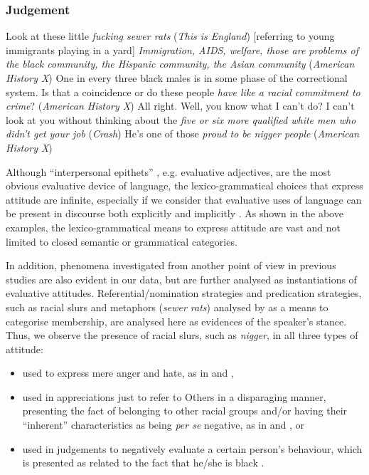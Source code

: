 \documentclass[output=paper]{LSP/langsci}
\begin{document}
\subsubsection{Judgement}


\ea \label{ex:2:12} Look at these little \emph{fucking sewer rats} (\textit{This is England}) [referring to young immigrants playing in a yard]
\z
\ea \label{ex:2:13} \emph{Immigration, AIDS, welfare, those are problems of the black community, the Hispanic community, the Asian community} (\textit{American History X})
\z
\ea \label{ex:2:14} One in every three black males is in some phase of the correctional system. Is that a coincidence or do these people \emph{have like a racial commitment to crime}? (\textit{American History X})
\z
\ea \label{ex:2:15} All right. Well, you know what I can't do? I can't look at you without thinking about the \emph{five or six more qualified white men who didn't get your job} (\textit{Crash})
\z
\ea \label{ex:2:16} He's one of those \emph{proud to be nigger people} (\textit{American History X})
\z

Although “interpersonal epithets” \citep[see][376--377]{Halliday2014}, e.g. evaluative adjectives, are the most obvious evaluative device of language, the lexico-grammatical choices that express attitude are infinite, especially if we consider that evaluative uses of language can be present in discourse both explicitly and implicitly \citep[see][23] {Munday2012}. As shown in the above examples, the lexico-grammatical means to express attitude are vast and not limited to closed semantic or grammatical categories.

In addition, phenomena investigated from another point of view in previous studies are also evident in our data, but are further analysed as instantiations of evaluative attitudes. Referential/nomination strategies and predication strategies, such as racial slurs and metaphors (\textit{sewer rats}) analysed by \citet{Reisigl2001} as a means to categorise membership, are analysed here as evidences of the speaker's stance. Thus, we observe the presence of racial slurs, such as \textit{nigger}, in all three types of attitude:

\begin{itemize}
\item used to express mere anger and hate, as in  and ,
\item used in appreciations just to refer to Others in a disparaging manner, presenting the fact of belonging to other racial groups and/or having their “inherent” characteristics as being \textit{per se} negative, as in  and , or
\item used in judgements to negatively evaluate a certain person's behaviour, which is presented as related to the fact that he/she is black .
\end{itemize}
\end{document}

